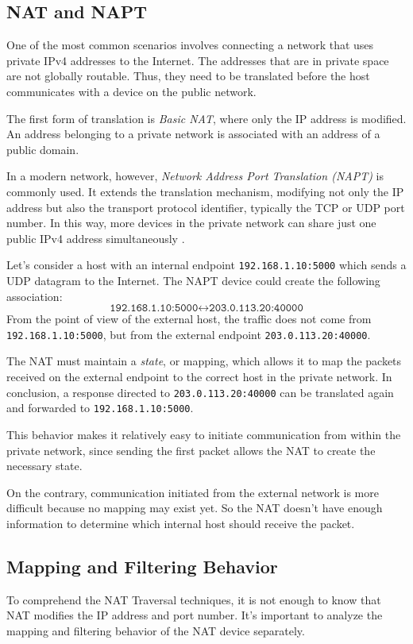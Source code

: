 \subsection{NAT and NAPT}
One of the most common scenarios involves connecting a network that uses private IPv4 addresses to the Internet. The addresses that are in private space are not globally routable. Thus, they need to be translated before the host communicates with a device on the public network.

The first form of translation is \textit{Basic NAT}, where only the IP address is modified. An address belonging to a private network is associated with an address of a public domain.

In a modern network, however, \textit{Network Address Port Translation (NAPT)} is commonly used. It extends the translation mechanism, modifying not only the IP address but also the transport protocol identifier, typically the TCP or UDP port number.
In this way, more devices in the private network can share just one public IPv4 address simultaneously \cite{rfc3022}.

\begin{example}
	Let's consider a host with an internal endpoint \texttt{192.168.1.10:5000} which sends a UDP datagram to the Internet. The NAPT device could create the following association:
	\[
		\texttt{192.168.1.10:5000}
		\longleftrightarrow
		\texttt{203.0.113.20:40000}
	\]
	From the point of view of the external host, the traffic does not come from \texttt{192.168.1.10:5000}, but from the external endpoint \texttt{203.0.113.20:40000}.

	The NAT must maintain a \textit{state}, or mapping, which allows it to map the packets received on the external endpoint to the correct host in the private network.
	In conclusion, a response directed to \texttt{203.0.113.20:40000} can be translated again and forwarded to \texttt{192.168.1.10:5000}.
\end{example}
This behavior makes it relatively easy to initiate communication from within the private network, since sending the first packet allows the NAT to create the necessary state.

On the contrary, communication initiated from the external network is more difficult because no mapping may exist yet. So the NAT doesn't have enough information to determine which internal host should receive the packet.

\subsection{Mapping and Filtering Behavior}
To comprehend the NAT Traversal techniques, it is not enough to know that NAT modifies the IP address and port number. It's important to analyze the mapping and filtering behavior of the NAT device separately.

